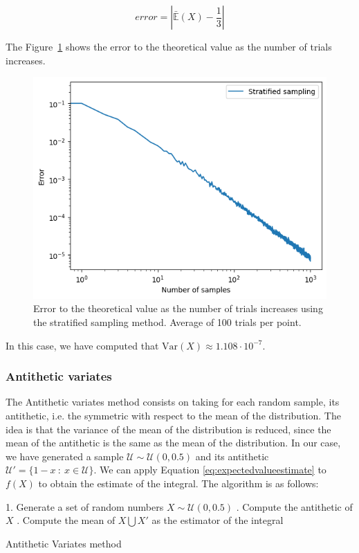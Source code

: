 \documentclass{article}
\begin{document}
\begin{equation*} error = | \bar{\mathbb{E}}(X) - \frac{1}{3} | \end{equation*}

The Figure~\ref{fig:stratifiedsampling} shows the error to the theoretical value as the number of trials increases.

\begin{figure}[H]
	\centering
	\includegraphics[width=0.5\linewidth]{./Figures/VarianceReduction/stratified.png}
	\caption{Error to the theoretical value as the number of trials increases using the stratified sampling method. Average of 100 trials per point.}
	\label{fig:stratifiedsampling}
\end{figure}

In this case, we have computed that \(\mathrm{Var}(X) \approx 1.108 \cdot 10^{-7}\).

\subsubsection{Antithetic variates}
\label{sec:antithetic_variates}

The Antithetic variates method consists on taking for each random sample, its antithetic, i.e. the symmetric with respect to the mean of the distribution. The idea is that the variance of the mean of the distribution is reduced, since the mean of the antithetic is the same as the mean of the distribution. In our case, we have generated a sample \(\mathcal{U} \sim \mathcal{U}(0,0.5)\) and its antithetic \(\mathcal{U}' = \{1 - x \ : \ x \in \mathcal{U}\}\). We can apply Equation \eqref{eq:expectedvalueestimate} to \(f(X)\) to obtain the estimate of the integral. The algorithm is as follows:

\begin{center}
	\begin{minipage}{0.7\linewidth} %
		\begin{algorithm}[H]
			1. Generate a set of random numbers \(X \sim \mathcal{U}(0,0.5)\) . Compute the antithetic of \(X\) . Compute the mean of \(X \bigcup X'\) as the estimator of the integral \;
			\caption{Antithetic Variates method} %
			\label{alg:antitheticvariates}   %
		\end{algorithm}
	\end{minipage}
\end{center}
\end{document}

